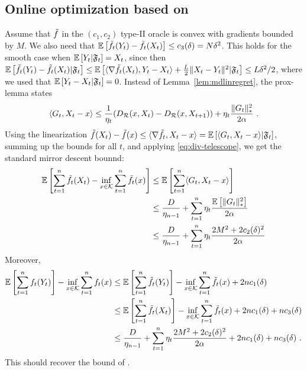 \subsection{Online optimization based on \citet{saha2011improved}}
Assume that $\tilde{f}$ in the $(c_1,c_2)$ type-II oracle is convex with gradients bounded by $M$. We also need that
$\mathbb{E}\left[\tilde{f}_t(Y_t)-\tilde{f}_t(X_t)\right] \le c_3(\delta) = N \delta^2$. This holds for the smooth case when $\mathbb{E}\left[Y_t|\mathfrak{F}_t\right]=X_t$, since then
$\mathbb{E}\left[\tilde{f}_t(Y_t)-\tilde{f}_t(X_t)|\mathfrak{F}_t\right] \le \mathbb{E}\left[\langle \nabla \tilde{f}_t(X_t),Y_t-X_t \rangle+\tfrac{L}{2}\|X_t-Y_t\|^2|\mathfrak{F}_t\right] \le L\delta^2/2$, where we used that $\mathbb{E}\left[Y_t-X_t|\mathfrak{F}_t\right]=0$.
Instead of Lemma~\ref{lem:mdlinregret}, the prox-lemma states
\[
\langle G_t,X_t-x \rangle \le \frac{1}{\eta_t}(D_{\mathcal{R}}(x,X_t)-D_{\mathcal{R}}(x,X_{t+1})) + \eta_t \frac{\|G_t\|_*^2}{2\alpha}~.
\]
Using the linearization $\tilde{f}(X_t) - \tilde{f}(x) \le \langle \nabla \tilde{f}_t,X_t-x \rangle = \mathbb{E}\left[\langle  G_t,X_t-x \rangle| \mathfrak{F}_t\right]$, summing up the bounds for all $t$, and applying \eqref{eq:div-telescope}, we get the standard mirror descent bounnd:
\begin{align}
\mathbb{E}\left[\sum_{t=1}^n \tilde{f}_t(X_t)-\inf_{x \in \mathcal{K}} \sum_{t=1}^n \tilde{f}_t(x)\right] 
& \le \mathbb{E}\left[\sum_{t=1}^n \langle G_t,X_t-x \rangle\right] \nonumber \\
&\le \frac{D}{\eta_{n-1}} + \sum_{t=1}^n \eta_t \frac{\mathbb{E}\left[\|G_t\|_*^2\right]}{2\alpha} \nonumber \\
& \le \frac{D}{\eta_{n-1}}  + \sum_{t=1}^n \eta_t \frac{2M^2 + 2 c_2(\delta)^2}{2\alpha} 
\label{eq:md-bound}
\end{align}
Moreover, 
\begin{align*}
\mathbb{E}\left[\sum_{t=1}^n f_t(Y_t)\right] - \inf_{x \in \mathcal{K}} \sum_{t=1}^n f_t(x)
& \le \mathbb{E}\left[\sum_{t=1}^n \tilde{f}_t(Y_t) \right]- \inf_{x \in \mathcal{K}} \sum_{t=1}^n \tilde{f}_t(x) + 2 n c_1(\delta) \\
& \le \mathbb{E}\left[\sum_{t=1}^n \tilde{f}_t(X_t)\right] - \inf_{x \in \mathcal{K}} \sum_{t=1}^n \tilde{f}_t(x) + 2 n c_1(\delta) + n c_3(\delta) \\
& \le \frac{D}{\eta_{n-1}}  + \sum_{t=1}^n \eta_t \frac{2M^2 + 2 c_2(\delta)^2}{2\alpha} +  2 n c_1(\delta) + n c_3(\delta)~.
\end{align*}
This should recover the bound of \citet{saha2011improved}.

